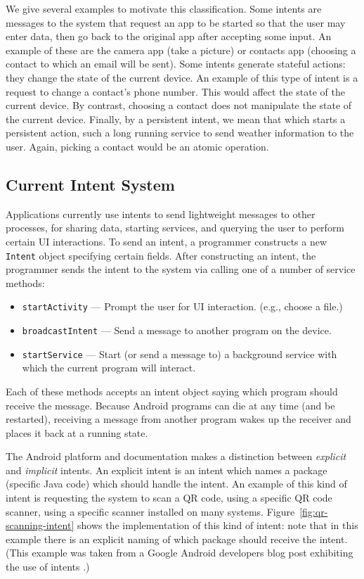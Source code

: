 \documentclass{acm_proc_article-sp}
\begin{document}
We give several examples to motivate this classification.  Some
intents are messages to the system that request an app to be started
so that the user may enter data, then go back to the original app
after accepting some input.  An example of these are the camera app
(take a picture) or contacts app (choosing a contact to which an email
will be sent).  Some intents generate stateful actions: they change
the state of the current device.  An example of this type of intent is
a request to change a contact's phone number.  This would affect the
state of the current device.  By contrast, choosing a contact does not
manipulate the state of the current device.  Finally, by a persistent
intent, we mean that which starts a persistent action, such a long
running service to send weather information to the user.  Again,
picking a contact would be an atomic operation.

\subsection{Current Intent System}

Applications currently use intents to send lightweight messages to
other processes, for sharing data, starting services, and querying the
user to perform certain UI interactions.  To send an intent, a
programmer constructs a new \texttt{Intent} object specifying certain
fields.  After constructing an intent, the programmer sends the intent
to the system via calling one of a number of service methods: 
\begin{itemize}
\item \texttt{startActivity} --- Prompt the user for UI
  interaction. (e.g., choose a file.)
\item \texttt{broadcastIntent} --- Send a message to another program
  on the device.
\item \texttt{startService} --- Start (or send a message to) a
  background service with which the current program will interact.
\end{itemize}
Each of these methods accepts an intent object saying which program
should receive the message.  Because Android programs can die at any
time (and be restarted), receiving a message from another program
wakes up the receiver and places it back at a running state.

The Android platform and documentation makes a distinction between
\emph{explicit} and \emph{implicit} intents.  An explicit intent is an
intent which names a package (specific Java code) which should handle
the intent.  An example of this kind of intent is requesting the
system to scan a QR code, using a specific QR code scanner, using a
specific scanner installed on many systems.
Figure~\ref{fig:qr-scanning-intent} shows the implementation of this
kind of intent: note that in this example there is an explicit naming
of which package should receive the intent.  (This example was taken
from a Google Android developers blog post exhibiting the use of
intents \cite{android:intentblog}.)
\end{document}
